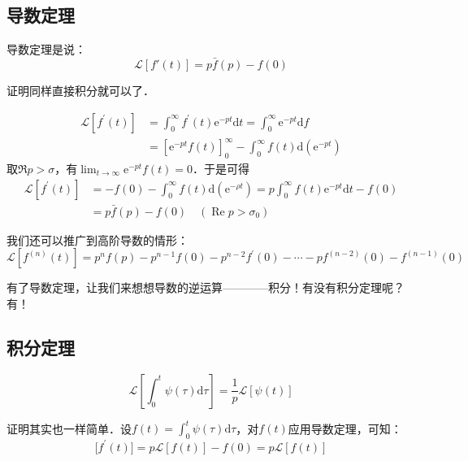 \subsection{导数定理}

导数定理是说：
\begin{equation}
\mathscr L[f'(t)]=p\bar f(p)-f(0)
\end{equation}

证明同样直接积分就可以了．

\begin{equation}
\begin{aligned} \mathscr L[f^{\prime}(t)] & = \int_{0}^{\infty} f^{\prime}(t) \mathrm{e}^{-p t} \mathrm{d} t=\int_{0}^{\infty} \mathrm{e}^{-p t} \mathrm{d} f \\ &=\left[\mathrm{e}^{-p t} f(t)\right]_{0}^{\infty}-\int_{0}^{\infty} f(t) \mathrm{d}\left(\mathrm{e}^{-p t}\right) \end{aligned}
\end{equation}
取$\Re p>\sigma$，有$\lim_{t\to\infty}\mathrm{e}^{-pt}f(t)=0$．于是可得
\begin{equation}
\begin{aligned} \mathscr L[f^{\prime}(t)] & = -f(0)-\int_{0}^{\infty} f(t) \mathrm{d}\left(\mathrm{e}^{-\rho t}\right)=p \int_{0}^{\infty} f(t) \mathrm{e}^{-p t} \mathrm{d} t-f(0) \\ &=p \bar{f}(p)-f(0) \quad\left(\operatorname{Re} p>\sigma_{0}\right) \end{aligned}
\end{equation}

我们还可以推广到高阶导数的情形：
\begin{equation}
\mathscr L[f^{(n)}(t)] = p^{n} f(p)-p^{n-1} f(0)-p^{n-2} f^{\prime}(0)-\cdots-p f^{(n-2)}(0)-f^{(n-1)}(0)
\end{equation} 

有了导数定理，让我们来想想导数的逆运算————积分！有没有积分定理呢？有！

\subsection{积分定理}
\begin{equation}
\mathscr L\left[\int_{0}^{t} \psi(\tau) \mathrm{d} \tau \right]=\frac{1}{p} \mathscr{L}[\psi(t)]
\end{equation}

证明其实也一样简单．设$\displaystyle f(t)=\int_{0}^{t} \psi(\tau) \mathrm{d} \tau$，对$f(t)$应用导数定理，可知：
\begin{equation}
\mathscr[f^{\prime}(t)]=p \mathscr{L}[f(t)]-f(0)=p \mathscr{L}[f(t)]
\end{equation}